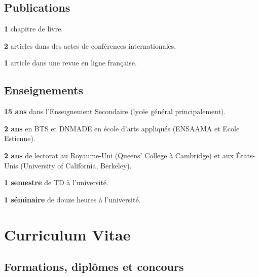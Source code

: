 \documentclass[
  10pt,
]{article}
\begin{document}
\hypertarget{publications}{%
\subsection{Publications}\label{publications}}

\textbf{1} chapitre de livre.

\textbf{2} articles dans des actes de conférences internationales.

\textbf{1} article dans une revue en ligne française.

\hypertarget{enseignements}{%
\subsection{Enseignements}\label{enseignements}}

\textbf{15 ans} dans l'Enseignement Secondaire (lycée général principalement).

\textbf{2 ans } en BTS et DNMADE en école d'arts appliqués (ENSAAMA et Ecole Estienne).

\textbf{2 ans } de lectorat au Royaume-Uni (Queens' College à Cambridge) et aux États-Unis (University of California, Berkeley).

\textbf{1 semestre} de TD à l'université.

\textbf{1 séminaire} de douze heures à l'université.

\pagebreak

\hypertarget{curriculum-vitae}{%
\section{Curriculum Vitae}\label{curriculum-vitae}}

\hypertarget{formations-dipluxf4mes-et-concours}{%
\subsection{Formations, diplômes et concours}\label{formations-dipluxf4mes-et-concours}}
\end{document}

